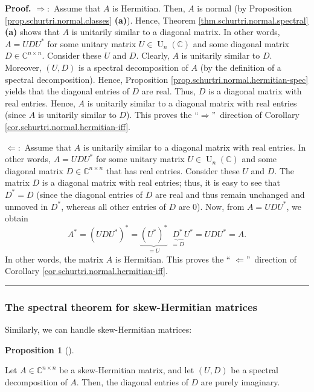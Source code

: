 \documentclass[numbers=enddot,12pt,final,onecolumn,notitlepage]{scrartcl}%
\numberwithin{exer}{subsection}
\theoremstyle{definition}
\newtheorem{prop}[theo]{Proposition}
\newenvironment{proposition}[1][]
{\begin{prop}[#1]\begin{leftbar}}
{\end{leftbar}\end{prop}}
\newenvironment{proof}[1][Proof]{\noindent\textbf{#1.} }{\ \rule{0.5em}{0.5em}}
\begin{document}
\begin{proof}
$\Longrightarrow:$ Assume that $A$ is Hermitian. Then, $A$ is normal (by
Proposition \ref{prop.schurtri.normal.classes} \textbf{(a)}). Hence, Theorem
\ref{thm.schurtri.normal.spectral} \textbf{(a)} shows that $A$ is unitarily
similar to a diagonal matrix. In other words, $A=UDU^{\ast}$ for some unitary
matrix $U\in\operatorname*{U}\nolimits_{n}\left(  \mathbb{C}\right)  $ and
some diagonal matrix $D\in\mathbb{C}^{n\times n}$. Consider these $U$ and $D$.
Clearly, $A$ is unitarily similar to $D$. Moreover, $\left(  U,D\right)  $ is
a spectral decomposition of $A$ (by the definition of a spectral
decomposition). Hence, Proposition \ref{prop.schurtri.normal.hermitian-spec}
yields that the diagonal entries of $D$ are real. Thus, $D$ is a diagonal
matrix with real entries. Hence, $A$ is unitarily similar to a diagonal matrix
with real entries (since $A$ is unitarily similar to $D$). This proves the
\textquotedblleft$\Longrightarrow$\textquotedblright\ direction of Corollary
\ref{cor.schurtri.normal.hermitian-iff}. \medskip

$\Longleftarrow:$ Assume that $A$ is unitarily similar to a diagonal matrix
with real entries. In other words, $A=UDU^{\ast}$ for some unitary matrix
$U\in\operatorname*{U}\nolimits_{n}\left(  \mathbb{C}\right)  $ and some
diagonal matrix $D\in\mathbb{C}^{n\times n}$ that has real entries. Consider
these $U$ and $D$. The matrix $D$ is a diagonal matrix with real entries;
thus, it is easy to see that $D^{\ast}=D$ (since the diagonal entries of $D$
are real and thus remain unchanged and unmoved in $D^{\ast}$, whereas all
other entries of $D$ are $0$). Now, from $A=UDU^{\ast}$, we obtain
\[
A^{\ast}=\left(  UDU^{\ast}\right)  ^{\ast}=\underbrace{\left(  U^{\ast
}\right)  ^{\ast}}_{=U}\ \ \underbrace{D^{\ast}}_{=D}U^{\ast}=UDU^{\ast}=A.
\]
In other words, the matrix $A$ is Hermitian. This proves the \textquotedblleft%
$\Longleftarrow$\textquotedblright\ direction of Corollary
\ref{cor.schurtri.normal.hermitian-iff}.
\end{proof}

\subsubsection{The spectral theorem for skew-Hermitian matrices}

Similarly, we can handle skew-Hermitian matrices:

\begin{proposition}
\label{prop.schurtri.normal.skewherm-spec}Let $A\in\mathbb{C}^{n\times n}$ be
a skew-Hermitian matrix, and let $\left(  U,D\right)  $ be a spectral
decomposition of $A$. Then, the diagonal entries of $D$ are purely imaginary.
\end{proposition}
\end{document}
